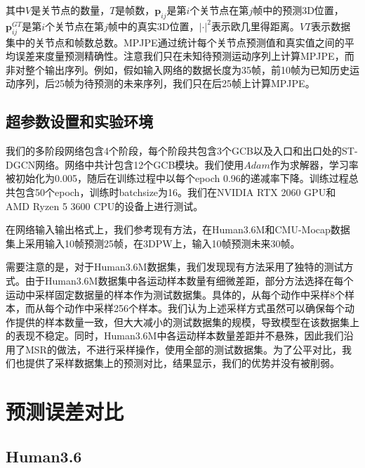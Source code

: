 其中$V$是关节点的数量，$T$是帧数，$\mathbf{p}_{ij}$是第$i$个关节点在第$j$帧中的预测3D位置，$\mathbf{p}^{GT}_{ij}$是第$i$个关节点在第$j$帧中的真实3D位置，$|\cdot|^2$表示欧几里得距离。$VT$表示数据集中的关节点和帧数总数。MPJPE通过统计每个关节点预测值和真实值之间的平均误差来度量预测精确性。注意我们只在未知待预测运动序列上计算MPJPE，而非对整个输出序列。例如，假如输入网络的数据长度为35帧，前10帧为已知历史运动序列，后25帧为待预测的未来序列，我们只在后25帧上计算MPJPE。

\subsection{超参数设置和实验环境}
我们的多阶段网络包含4个阶段，每个阶段共包含3个GCB以及入口和出口处的ST-DGCN网络。网络中共计包含12个GCB模块。我们使用$Adam$作为求解器，学习率被初始化为0.005，随后在训练过程中以每个epoch 0.96的递减率下降。训练过程总共包含50个epoch，训练时batchsize为16。我们在NVIDIA RTX 2060 GPU和AMD Ryzen 5 3600 CPU的设备上进行测试。

在网络输入输出格式上，我们参考现有方法，在Human3.6M和CMU-Mocap数据集上采用输入10帧预测25帧，在3DPW上，输入10帧预测未来30帧。

需要注意的是，对于Human3.6M数据集，我们发现现有方法采用了独特的测试方式。由于Human3.6M数据集中各运动样本数量有细微差距，部分方法选择在每个运动中采样固定数据量的样本作为测试数据集。具体的，\parencite{li2020dynamic, mao2019learning, martinez2017human}从每个动作中采样8个样本，而\parencite{mao2020history}从每个动作中采样256个样本。我们认为上述采样方式虽然可以确保每个动作提供的样本数量一致，但大大减小的测试数据集的规模，导致模型在该数据集上的表现不稳定。同时，Human3.6M中各运动样本数量差距并不悬殊，因此我们沿用了MSR\parencite{dang2021msr}的做法，不进行采样操作，使用全部的测试数据集。为了公平对比，我们也提供了采样数据集上的预测对比，结果显示，我们的优势并没有被削弱。



\section{预测误差对比}\label{section:prediction_error}
\subsection{Human3.6}


